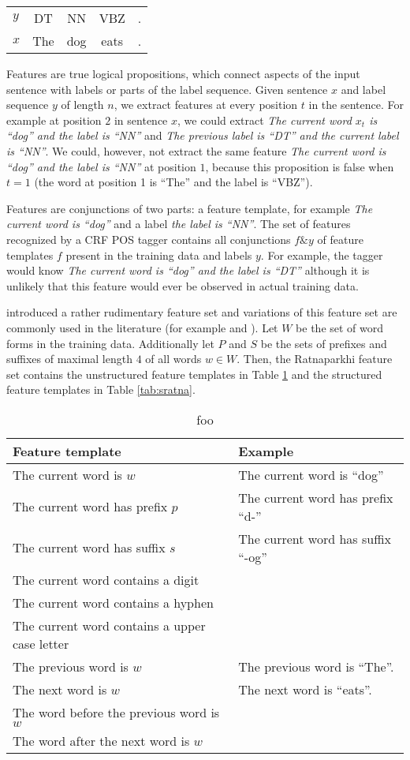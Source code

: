 \begin{tabular}{lcccc}
$y$ & DT & NN & VBZ & .\\
$x$ & The & dog & eats & .
\end{tabular}

Features are true logical propositions, which connect aspects of the
input sentence with labels or parts of the label sequence. Given
sentence $x$ and label sequence $y$ of length $n$, we extract features
at every position $t$ in the sentence. For example at position $2$ in
sentence $x$, we could extract {\it The current word $x_t$ is ``dog''
  and the label is ``NN''} and {\it The previous label is ``DT'' and
  the current label is ``NN''}. We could, however, not extract the
same feature {\it The current word is ``dog'' and the label is ``NN''}
at position $1$, because this proposition is false when $t = 1$ (the
word at position 1 is ``The'' and the label is ``VBZ'').

Features are conjunctions of two parts: a feature template, for
example {\it The current word is ``dog''} and a label {\it the
  label is ``NN''}. The set of features recognized by a CRF POS tagger
contains all conjunctions $f \& y$ of feature templates $f$
present in the training data and labels $y$. For example, the tagger
would know {\it The current word is ``dog'' and the label is ``DT''}
although it is unlikely that this feature would ever be observed in
actual training data.

\cite{Ratnaparkhi1996} introduced a rather rudimentary feature set and
variations of this feature set are commonly used in the literature
(for example \cite{Collins2002} and \cite{Lafferty2001}). Let $W$ be
the set of word forms in the training data. Additionally let $P$ and
$S$ be the sets of prefixes and suffixes of maximal length $4$ of all
words $w \in W$. Then, the Ratnaparkhi feature set contains the
unstructured feature templates in Table \ref{tab:uratna} and the
structured feature templates in Table \ref{tab:sratna}.

\begin{table}[!htb]
\begin{tabular}{ll}  
Feature template & Example\\
\hline
The current word is $w$ & The current word is ``dog''\\
The current word has prefix $p$ & The current word has prefix ``d-''\\
The current word has suffix $s$ & The current word has suffix ``-og''\\
The current word contains a digit & \\
The current word contains a hyphen & \\
The current word contains a upper case letter & \\
The previous word is $w$ & The previous word is ``The''. \\
The next word is $w$ & The next word is ``eats''. \\
The word before the previous word is $w$ & \\
The word after the next word is $w$ & \\
\end{tabular}
\caption{foo}\label{tab:uratna}
\end{table}

